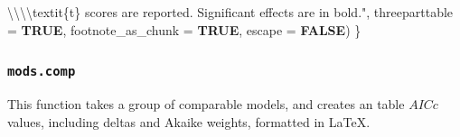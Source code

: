 \documentclass[
  bookmarksnumbered]{article}
\newenvironment{Shaded}{\begin{snugshade}}{\end{snugshade}}
\newcommand{\AttributeTok}[1]{\textcolor[rgb]{0.80,0.80,0.80}{#1}}
\newcommand{\ConstantTok}[1]{\textcolor[rgb]{0.86,0.64,0.64}{\textbf{#1}}}
\newcommand{\NormalTok}[1]{\textcolor[rgb]{0.80,0.80,0.80}{#1}}
\newcommand{\SpecialCharTok}[1]{\textcolor[rgb]{0.86,0.64,0.64}{#1}}
\newcommand{\StringTok}[1]{\textcolor[rgb]{0.80,0.58,0.58}{#1}}
\begin{document}
\begin{Shaded}
\begin{Highlighting}[]
\StringTok{             }\SpecialCharTok{\textbackslash{}\textbackslash{}\textbackslash{}\textbackslash{}}\StringTok{textit\{t\} scores are reported. Significant effects are in bold."}\NormalTok{,}
             \AttributeTok{threeparttable =} \ConstantTok{TRUE}\NormalTok{, }
             \AttributeTok{footnote\_as\_chunk =} \ConstantTok{TRUE}\NormalTok{, }
             \AttributeTok{escape =} \ConstantTok{FALSE}\NormalTok{)}
\NormalTok{\}}
\end{Highlighting}
\end{Shaded}

\subsubsection{\texorpdfstring{\texttt{mods.comp}}{mods.comp}}\label{mods.comp}

This function takes a group of comparable models, and creates an table \(AICc\) values, including deltas and Akaike weights, formatted in \LaTeX.
\end{document}
